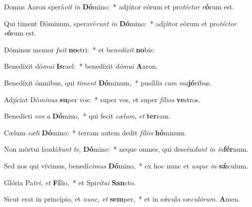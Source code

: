 \item Domus Aaron sperá\textit{vit} \textit{in} \textbf{Dó}mino:~* adjútor eórum et pro\textit{téctor} \textit{e}\textbf{ó}rum est.
\item Qui timent Dóminum, speravé\textit{runt} \textit{in} \textbf{Dó}mino:~* adjútor eórum et pro\textit{téctor} \textit{e}\textbf{ó}rum est.
\item Dóminus memor \textit{fuit} \textbf{no}stri:~* et be\textit{nedíxit} \textbf{no}bis:
\item Benedíxit dó\textit{mui} \textbf{Is}rael:~* benedíxit \textit{dómui} \textbf{A}aron.
\item Benedíxit ómnibus, qui \textit{timent} \textbf{Dó}minum,~* pusíl\textit{lis} \textit{cum} \textit{ma}\textbf{jó}ribus.
\item Adjíciat Dó\textit{minus} \textbf{su}per vos:~* super vos, et super \textit{fílios} \textbf{ve}stros.
\item Benedícti \textit{vos} \textit{a} \textbf{Dó}mino,~* qui fecit \textit{cælum}, \textit{et} \textbf{ter}ram.
\item Cælum \textit{cæli} \textbf{Dó}mino:~* terram autem dedit \textit{fíliis} \textbf{hó}minum.
\item Non mórtui laudá\textit{bunt} \textit{te}, \textbf{Dó}mine:~* neque omnes, qui descén\textit{dunt} \textit{in} \textit{in}\textbf{fér}num.
\item Sed nos qui vívimus, benedí\textit{cimus} \textbf{Dó}mino,~* ex hoc nunc et \textit{usque} \textit{in} \textbf{sǽ}culum.
\item Glória Pa\hspace{0.03em}\textit{tri,} \textit{et} \textbf{Fí}lio,~* et Spi\textit{rítui} \textbf{San}cto.
\item Sicut erat in princípio, et \textit{nunc,} \textit{et} \textbf{sem}per,~* et in sǽcula sæ\textit{culórum}. \textbf{A}men.
